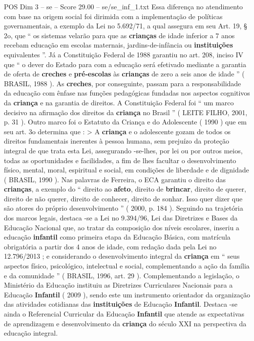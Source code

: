 \begin{textsample}{POS Dim 3 – se – Score 29.00 – se/se\_inf\_1.txt}
Essa diferença no atendimento com base na origem social foi dirimida com a implementação de políticas governamentais, a exemplo da Lei no 5.692/71, a qual assegura em seu Art. 19, § 2o, que “ os sistemas velarão para que as \textbf{crianças} de idade inferior a 7 anos recebam educação em escolas maternais, jardins-de-infância ou \textbf{instituições} equivalentes ”.
Já a Constituição Federal de 1988 garantiu no art. 208, inciso IV que “ o dever do Estado para com a educação será efetivado mediante a garantia de oferta de \textbf{creches} e \textbf{pré-escolas} às \textbf{crianças} de zero a seis anos de idade ” ( BRASIL, 1988 ).
As \textbf{creches}, por conseguinte, passam para a responsabilidade da educação com ênfase nas funções pedagógicas fundadas nos aspectos cognitivos da \textbf{criança} e na garantia de direitos.
A Constituição Federal foi “ um marco decisivo na afirmação dos direitos da \textbf{criança} no Brasil ” ( LEITE FILHO, 2001, p. 31 ).
Outro marco foi o Estatuto da Criança e do Adolescente ( 1990 ) que em seu art. 3o determina que : > A \textbf{criança} e o adolescente gozam de todos os direitos fundamentais inerentes à pessoa humana, sem prejuízo da proteção integral de que trata esta Lei, assegurando -se-lhes, por lei ou por outros meios, todas as oportunidades e facilidades, a fim de lhes facultar o desenvolvimento físico, mental, moral, espiritual e social, em condições de liberdade e de dignidade ( BRASIL, 1990 ).
Nas palavras de Ferreira, o ECA garantiu o direito das \textbf{crianças}, a exemplo do “ direito ao \textbf{afeto}, direito de \textbf{brincar}, direito de querer, direito de não querer, direito de conhecer, direito de sonhar.
Isso quer dizer que são atores do próprio desenvolvimento ” ( 2000, p. 184 ).
Seguindo na trajetória dos marcos legais, destaca -se a Lei no 9.394/96, Lei das Diretrizes e Bases da Educação Nacional que, ao tratar da composição dos níveis escolares, inseriu a educação \textbf{infantil} como primeira etapa da Educação Básica, com matrícula obrigatória a partir dos 4 anos de idade, com redação dada pela Lei no 12.796/2013 ; e considerando o desenvolvimento integral da \textbf{criança} em “ seus aspectos físico, psicológico, intelectual e social, complementando a ação da família e da comunidade ” ( BRASIL, 1996, art. 29 ).
Complementando a legislação, o Ministério da Educação instituiu as Diretrizes Curriculares Nacionais para a Educação \textbf{Infantil} ( 2009 ), sendo este um instrumento orientador da organização das atividades cotidianas das \textbf{instituições} de Educação \textbf{Infantil}.
Destaca -se ainda o Referencial Curricular da Educação \textbf{Infantil} que atende as expectativas de aprendizagem e desenvolvimento da \textbf{criança} do século XXI na perspectiva da educação integral.

\end{textsample}
